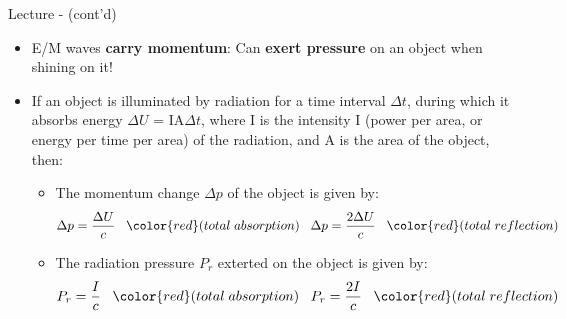 \begin{frame}{Lecture \summarizedlecture - \lecturesummarytitle (cont'd)}

\begin{itemize}

\item
E/M waves {\bf carry momentum}:
Can {\bf exert pressure} on an object when shining on it!\\
\item
If an object is illuminated by radiation for a time interval ${\Delta}t$,
during which it absorbs energy ${\Delta}U$ = IA${\Delta}t$,
where I is the intensity I (power per area, or energy per time
per area) of the radiation, and A is the area of the object, then:
\begin{itemize}
\item
The momentum change ${\Delta}p$ of the object is given by:
\begin{equation*}
    {\Delta}p = \frac{{\Delta}U}{c}
    \;\;\; {\color{red} \small (total \; absorption)}
    \;\;\;
    {\Delta}p = \frac{2{\Delta}U}{c}
    \;\;\; {\color{red} \small (total \; reflection)}
\end{equation*}
\item
The radiation pressure $P_r$ exterted on the object is given by:
\begin{equation*}
  P_r = \frac{I}{c}
  \;\;\; {\color{red} \small (total \; absorption)}
  \;\;\;
  P_r = \frac{2I}{c}
  \;\;\; {\color{red} \small (total \; reflection)}
\end{equation*}
\end{itemize}

\end{itemize}

\end{frame}
